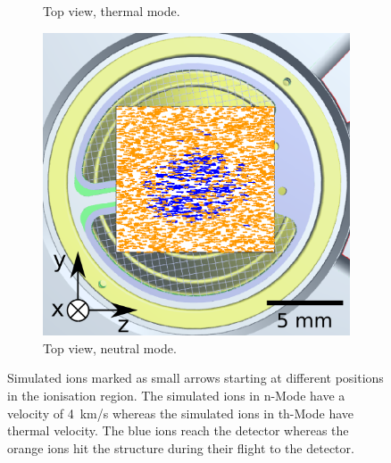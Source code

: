 \begin{figure}[h]
\begin{subfigure}[b]{.5\textwidth}
			\caption{Top view, thermal mode.}
			\label{fig:PFMentrSideTopSimThTop}
		\end{subfigure}
		\begin{subfigure}[b]{.5\textwidth}
			\centering
			\includegraphics[width=.8\textwidth]{Experiments/PFMEntrance_Top_nSim.png}
			\caption{Top view, neutral mode.}
		\end{subfigure}
		\caption{Simulated ions marked as small arrows starting at different positions in the ionisation region. The simulated ions in n-Mode have a velocity of 4~km/s whereas the simulated ions in th-Mode have thermal velocity. The blue ions reach the detector whereas the orange ions hit the structure during their flight to the detector.}
		\label{fig:PFMentrSideTopSimthnMode}
	\end{figure}
